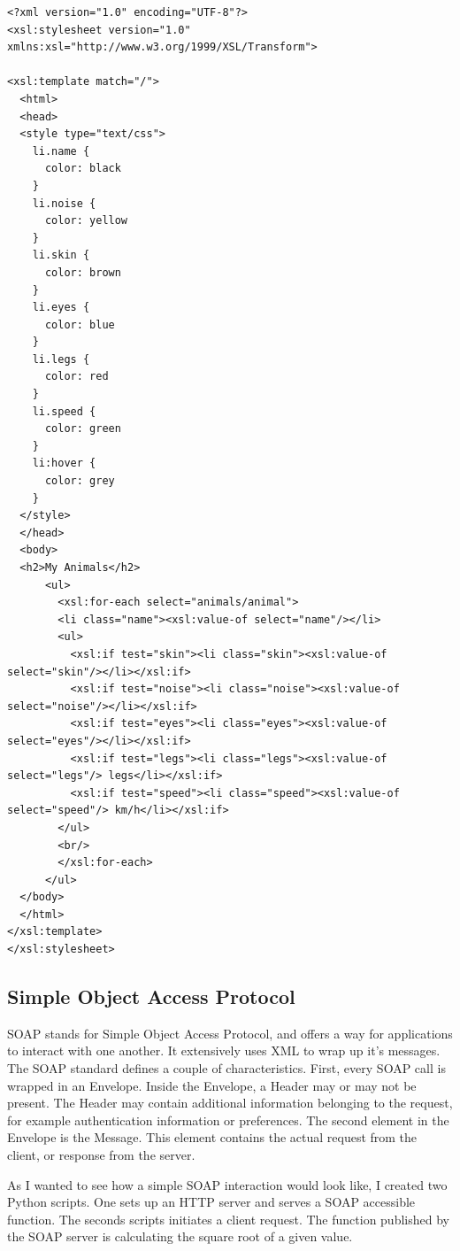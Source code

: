 \begin{verbatim}
<?xml version="1.0" encoding="UTF-8"?>
<xsl:stylesheet version="1.0" xmlns:xsl="http://www.w3.org/1999/XSL/Transform">

<xsl:template match="/">
  <html>
  <head>
  <style type="text/css">
    li.name {
      color: black
    }
    li.noise {
      color: yellow
    }
    li.skin {
      color: brown
    }
    li.eyes {
      color: blue
    }
    li.legs {
      color: red
    }
    li.speed {
      color: green
    }
    li:hover {
      color: grey
    }
  </style>
  </head>
  <body>
  <h2>My Animals</h2>
      <ul>
        <xsl:for-each select="animals/animal">
        <li class="name"><xsl:value-of select="name"/></li>
        <ul>
          <xsl:if test="skin"><li class="skin"><xsl:value-of select="skin"/></li></xsl:if>
          <xsl:if test="noise"><li class="noise"><xsl:value-of select="noise"/></li></xsl:if>
          <xsl:if test="eyes"><li class="eyes"><xsl:value-of select="eyes"/></li></xsl:if>
          <xsl:if test="legs"><li class="legs"><xsl:value-of select="legs"/> legs</li></xsl:if>
          <xsl:if test="speed"><li class="speed"><xsl:value-of select="speed"/> km/h</li></xsl:if>
        </ul>
        <br/>
        </xsl:for-each>
      </ul>
  </body>
  </html>
</xsl:template>
</xsl:stylesheet>
\end{verbatim}

\subsection{Simple Object Access Protocol}\label{subsection:soap}
SOAP stands for Simple Object Access Protocol, and offers a way for applications to interact with one another. It extensively uses XML to wrap up it's messages. The SOAP standard defines a couple of characteristics. First, every SOAP call is wrapped in an Envelope. Inside the Envelope, a Header may or may not be present. The Header may contain additional information belonging to the request, for example authentication information or preferences. The second element in the Envelope is the Message. This element contains the actual request from the client, or response from the server.

As I wanted to see how a simple SOAP interaction would look like, I created two Python scripts. One sets up an HTTP server and serves a SOAP accessible function. The seconds scripts initiates a client request. The function published by the SOAP server is calculating the square root of a given value.

